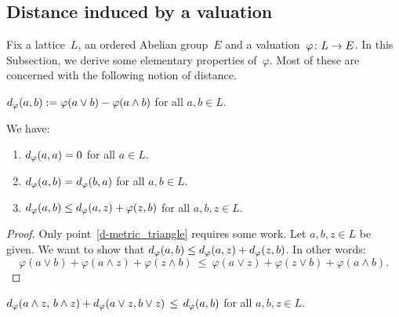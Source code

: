 \documentclass[main.tex]{subfiles}
\begin{document}
\subsection{Distance induced by a valuation}
Fix a lattice~$L$,
an ordered Abelian group~$E$
and a valuation~$\varphi\colon L\rightarrow E$.
In this Subsection,
we derive some elementary properties of~$\varphi$.
Most of these are concerned with the following notion
of distance.
\begin{dfn}
\label{D:d}
\quad
$d_\varphi(a,b):= \varphi(a\vee b) - \varphi(a \wedge b)$
\quad
for all $a,b\in L$.
\end{dfn}
\begin{lem}
\label{L:d-metric}
We have:
\begin{enumerate}
\item\label{d-metric_self} 
$d_\varphi(a,a)=0$ for all $a\in L$.
\item\label{d-metric_sym}
$d_\varphi(a,b)=d_\varphi(b,a)$ for all $a,b\in L$.
\item\label{d-metric_triangle}
$d_\varphi(a,b)\leq d_\varphi(a,z)+\varphi(z,b)$
for all $a,b,z\in L$.
\end{enumerate}
\end{lem}
\begin{proof}
Only point~\ref{d-metric_triangle} requires some work.
Let $a,b,z\in L$ be given.
We want to show that $d_\varphi(a,b) \leq d_\varphi(a,z)+d_\varphi(z,b)$.
In other words:
\begin{equation}
\label{eq:d-metric}
\varphi(a\vee b) + \varphi(a\wedge z) + \varphi (z\wedge b)
\ \leq\ 
\varphi (a\vee z) + \varphi(z\vee b) + \varphi (a\wedge b)\text{.}
\end{equation}

\end{proof}
%
%
\begin{lem}
\label{L:curry-wc-unif}
\quad
$d_\varphi(a\wedge z,\,b\wedge z)+
 d_\varphi(a\vee z,b\vee z)\,\leq\,d_\varphi(a,b)$
\quad for all $a,b,z\in L$.
\end{lem}
\end{document}
